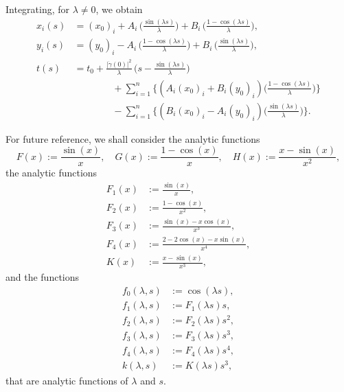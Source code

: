 \documentclass[10pt]{amsart}
\theoremstyle{definition}
\theoremstyle{remark}
\numberwithin{equation}{section}
\begin{document}
Integrating, for ${\lambda}\neq 0$, we obtain
\begin{equation}
\label{eq:geodesics}
\begin{split}
x_{i}(s)&=(x_{0})_{i}+A_{i}\,\bigg(\frac{\sin({\lambda} s)}{\lambda}\bigg)
+B_{i}\,\bigg(\frac{1-\cos({\lambda} s)}{\lambda}\bigg),
\\
y_{i}(s)&=(y_{0})_{i}-A_{i}\,\bigg(\frac{1-\cos({\lambda} s)}{\lambda}\bigg)
+B_{i}\,\bigg(\frac{\sin({\lambda} s)}{\lambda}\bigg),
\\
t(s)&=t_{0}+\frac{|{\dot{\gamma}}(0)|^2}{\lambda}\,\bigg(s-\frac{\sin({\lambda} s)}{\lambda}\bigg)
\\
&\qquad\qquad+\sum_{i=1}^n\bigg\{
(A_{i}(x_{0})_{i}+B_{i}(y_{0})_{i})\bigg(\frac{1-\cos({\lambda} s)}{\lambda}\bigg)\bigg\}
\\
&\qquad\qquad
-\sum_{i=1}^n\bigg\{(B_{i}(x_{0})_{i}-A_{i}(y_{0})_{i})
\bigg(\frac{\sin({\lambda} s)}{\lambda}\bigg)\bigg\}.
\end{split}
\end{equation}

For future reference, we shall consider the analytic functions
\begin{equation}
\label{eq:FGH}
F(x):=\frac{\sin(x)}{x},\quad  G(x):=\frac{1-\cos(x)}{x}, \quad H(x):=\frac{x-\sin(x)}{x^2},
\end{equation}
the analytic functions
\begin{equation}
\label{eq:Fi}
\begin{split}
F_1(x)&:=\frac{\sin(x)}{x},
\\
F_2(x)&:=\frac{1-\cos(x)}{x^2},
\\
F_3(x)&:=\frac{\sin(x)-x\cos(x)}{x^3},
\\
F_4(x)&:=\frac{2-2\cos(x)-x\sin(x)}{x^4},
\\
K(x)&:=\frac{x-\sin(x)}{x^3},
\end{split}
\end{equation}
and the functions
\begin{equation}
\label{eq:fi}
\begin{split}
f_0({\lambda}, s)&:=\cos({\lambda} s),
\\
f_1({\lambda}, s)&:=F_1({\lambda} s)s,
\\
f_2({\lambda}, s)&:=F_2({\lambda} s)s^2,
\\
f_3({\lambda}, s)&:=F_3({\lambda} s)s^3,
\\
f_4({\lambda}, s)&:=F_4({\lambda} s)s^4,
\\
k({\lambda}, s)&:=K({\lambda} s)s^3,
\end{split}
\end{equation}
that are analytic functions of ${\lambda}$ and $s$.
\end{document}
